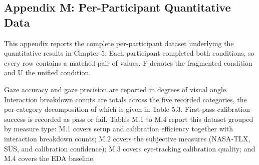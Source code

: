 \documentclass[
]{article}
\begin{document}
\clearpage
\hypertarget{appendix-k-per-participant-quantitative-data}{%
\subsection{Appendix M: Per-Participant Quantitative Data}\label{appendix-k-per-participant-quantitative-data}}

This appendix reports the complete per-participant dataset underlying the quantitative results in Chapter 5. Each participant completed both conditions, so every row contains a matched pair of values. F denotes the fragmented condition and U the unified condition.

Gaze accuracy and gaze precision are reported in degrees of visual angle. Interaction breakdown counts are totals across the five recorded categories, the per-category decomposition of which is given in Table 5.3. First-pass calibration success is recorded as pass or fail. Tables M.1 to M.4 report this dataset grouped by measure type: M.1 covers setup and calibration efficiency together with interaction breakdown counts; M.2 covers the subjective measures (NASA-TLX, SUS, and calibration confidence); M.3 covers eye-tracking calibration quality; and M.4 covers the EDA baseline.
\end{document}
